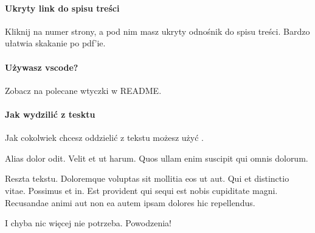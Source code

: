 \paragraph{Ukryty link do spisu treści}
Kliknij na numer strony, a pod nim masz ukryty odnośnik do spisu treści. Bardzo ułatwia skakanie po pdf'ie.

\paragraph{Używasz vscode?}
Zobacz na polecane wtyczki w README.

\paragraph{Jak wydzilić z tesktu}
Jak cokolwiek chcesz oddzielić z tekstu możesz użyć .

\begin{onepage}[1cm]
    \centering
    Alias dolor odit. Velit et ut harum. Quos ullam enim suscipit qui omnis dolorum.
\end{onepage}

Reszta tekstu.
Doloremque voluptas sit mollitia eos ut aut. Qui et distinctio vitae. Possimus et in. Est provident qui sequi est nobis cupiditate magni. Recusandae animi aut non ea autem ipsam dolores hic repellendus.

I chyba nic więcej nie potrzeba. Powodzenia!
